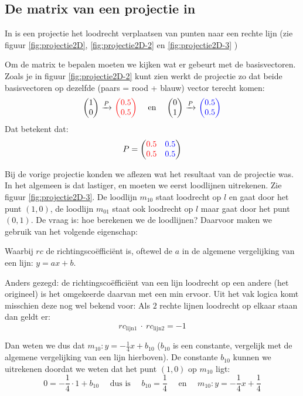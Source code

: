 \subsection{De matrix van een projectie in \RT} \label{projectie2D}
In \RT is een projectie  het loodrecht verplaatsen van punten   naar een rechte lijn (zie figuur \ref{fig:projectie2D},  \ref{fig:projectie2D-2} en \ref{fig:projectie2D-3} ) 


Om de matrix te bepalen moeten we kijken wat er gebeurt met de basisvectoren. 	
Zoals je in figuur \ref{fig:projectie2D-2} kunt zien werkt de projectie zo dat beide basisvectoren op dezelfde (paars = rood + blauw) vector terecht komen:
\[
    \vectwee{1}{0} \ \xrightarrow{P} \ \vectwee[red]{0.5}{0.5} \quad \text{ en } \quad 
    \vectwee{0}{1} \ \xrightarrow{P} \ \vectwee[blue]{0.5}{0.5}
\]
Dat betekent dat: \[P = \begin{pmatrix} {\color{red}0.5}&{\color{blue}0.5} \\ {\color{red}0.5}&{\color{blue}0.5} \end{pmatrix} \]


Bij de vorige projectie konden we aflezen wat het resultaat van de projectie was. In het algemeen is dat lastiger, en moeten we eerst loodlijnen uitrekenen. Zie figuur  \ref{fig:projectie2D-3}. De loodlijn $ m_{10} $ staat loodrecht op $l$ en gaat door het punt $(1,0)$, de loodlijn $m_{01}$ staat ook loodrecht op $l$ maar gaat door het punt $(0,1)$. De vraag is: hoe berekenen we de loodlijnen? Daarvoor maken we gebruik van het volgende eigenschap:

\myeig[rc loodlijn]{\[rc_{loodlijn} = \dfrac{-1}{rc_{origineel}}\]} 

Waarbij $rc$ de richtingscoëfficiënt is, oftewel de $a$ in de algemene vergelijking van een lijn: $y=ax+b$.

Anders gezegd: de richtingscoëfficiënt van een lijn loodrecht op een andere (het origineel) is het omgekeerde daarvan met een min ervoor. Uit het vak logica komt misschien deze nog wel bekend voor: Als $2$ rechte lijnen loodrecht op elkaar staan dan geldt er:
\[rc_{\text{lijn}1}\ \cdot\ rc_{\text{lijn}2} = -1\]

Dan weten we dus dat $m_{10}: y= -\frac{1}{4}x+b_{10}$ ($b_{10}$ is een constante, vergelijk met de algemene vergelijking van een lijn hierboven). De constante $b_{10}$ kunnen we uitrekenen doordat we weten dat het punt $(1,0)$ op $m_{10}$ ligt:  \[0 = -\frac{1}{4}\cdot 1 + b_{10}\quad \text{ dus is } \quad b_{10}= \frac{1}{4}\quad \text{ en } \quad m_{10}: y=-\frac{1}{4}x+\frac{1}{4}\] 
 

